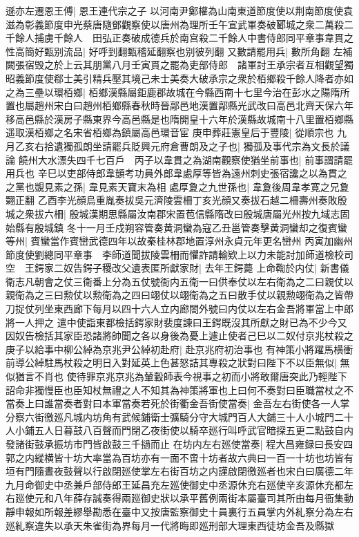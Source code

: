 遜亦左遷恩王傅|{
	恩王連代宗之子}
以河南尹鄭權為山南東道節度使以荆南節度使袁滋為彰義節度申光蔡唐隨鄧觀察使以唐州為理所壬午宣武軍奏破郾城之衆二萬殺二千餘人捕虜千餘人　田弘正奏破成德兵於南宫殺二千餘人中書侍郎同平章事韋貫之性高簡好甄别流品|{
	好呼到翻甄稽延翻察也别彼列翻}
又數請罷用兵|{
	數所角翻}
左補闕張宿毁之於上云其朋黨八月壬寅貫之罷為吏部侍郎　諸軍討王承宗者互相觀望獨昭義節度使郗士美引精兵壓其境己未士美奏大破承宗之衆於栢鄉殺千餘人降者亦如之為三壘以環栢鄉|{
	栢鄉漢縣屬鉅鹿郡故城在今縣西南十七里今治在彭水之陽隋所置也屬趙州宋白曰趙州栢鄉縣春秋時晉鄗邑地漢置鄗縣光武改曰高邑北齊天保六年移高邑縣於漢房子縣東界今高邑縣是也隋開皇十六年於漢縣故城南十八里置栢鄉縣遥取漢栢鄉之名宋省栢鄉為鎮屬高邑環音宦}
庚申葬莊憲皇后于豐陵|{
	從順宗也}
九月乙亥右拾遺獨孤朗坐請罷兵貶興元府倉曹朗及之子也|{
	獨孤及事代宗為文長於議論}
饒州大水漂失四千七百戶　丙子以韋貫之為湖南觀察使猶坐前事也|{
	前事謂請罷用兵也}
辛巳以吏部侍郎韋顗考功員外郎韋處厚等皆為遠州刺史張宿讒之以為貫之之黨也覬見素之孫|{
	韋見素天寶末為相}
處厚夐之九世孫也|{
	韋夐後周韋孝寛之兄夐翾正翻}
乙酉李光顔烏重胤奏拔吳元濟陵雲柵丁亥光顔又奏拔石越二柵壽州奏敗殷城之衆拔六柵|{
	殷城漢期思縣屬汝南郡宋置苞信縣隋改曰殷城唐屬光州按九域志固始縣有殷城鎮}
冬十一月壬戍朔容管奏黄洞蠻為寇乙丑邕管奏擊黄洞蠻却之復賓蠻等州|{
	賓蠻當作賓巒武德四年以故秦桂林郡地置淳州永貞元年更名巒州}
丙寅加幽州節度使劉總同平章事　李師道聞拔陵雲柵而懼詐請輸欵上以力未能討加師道檢校司空　王鍔家二奴告鍔子稷改父遺表匿所獻家財|{
	去年王鍔薨}
上命鞫於内仗|{
	新書儀衛志凡朝會之仗三衛番上分為五仗號衙内五衛一曰供奉仗以左右衛為之二曰親仗以親衛為之三曰勲仗以勲衛為之四曰翊仗以翊衛為之五曰散手仗以親勲翊衛為之皆帶刀捉仗列坐東西廊下每月以四十六人立内廊閤外號曰内仗以左右金吾將軍當上中郎將一人押之}
遣中使詣東都檢括鍔家財裴度諫曰王鍔既沒其所獻之財已為不少今又因奴告檢括其家臣恐諸將帥聞之各以身後為憂上遽止使者己巳以二奴付京兆杖殺之　庚子以給事中柳公綽為京兆尹公綽初赴府|{
	赴京兆府初治事也}
有神策小將躍馬横衝前導公綽駐馬杖殺之明日入對延英上色甚怒詰其專殺之狀對曰陛下不以臣無似|{
	無似猶言不肖也}
使待罪京兆京兆為輦轂師表今視事之初而小將敢爾唐突此乃輕陛下詔命非獨慢臣也臣知杖無禮之人不知其為神策將軍也上曰何不奏對曰臣職當杖之不當奏上曰誰當奏者對曰本軍當奏若死於街衢金吾街使當奏|{
	金吾左右街使各一人掌分察六街徼廵凡城内坊角有武候鋪衛士彍騎分守大城門百人大鋪三十人小城門二十人小鋪五人日暮鼓八百聲而門閉乙夜街使以騎卒廵行叫呼武官暗探五更二點鼓自内發諸街鼓承振坊市門皆啟鼓三千撾而止}
在坊内左右廵使當奏|{
	程大昌雍録曰長安四郭之内縱横皆十坊大率當為百坊亦有一面不啻十坊者故六典曰一百一十坊也坊皆有垣有門隨晝夜鼓聲以行啟閉廵使掌左右街百坊之内謹啟閉徼廵者也宋白曰廣德二年九月命御史中丞兼戶部侍郎王延昌充左廵使御史中丞源休充右廵使辛亥源休充都左右廵使元和八年薛存誠奏得兩廵御史狀以承平舊例兩街本屬臺司其所由每月衙集動靜申報如所報差繆舉勘悉在臺中又按唐監察御史十員裏行五員掌内外糺察分為左右廵糺察違失以承天朱雀街為界每月一代將晦即廵刑部大理東西徒坊金吾及縣獄}
